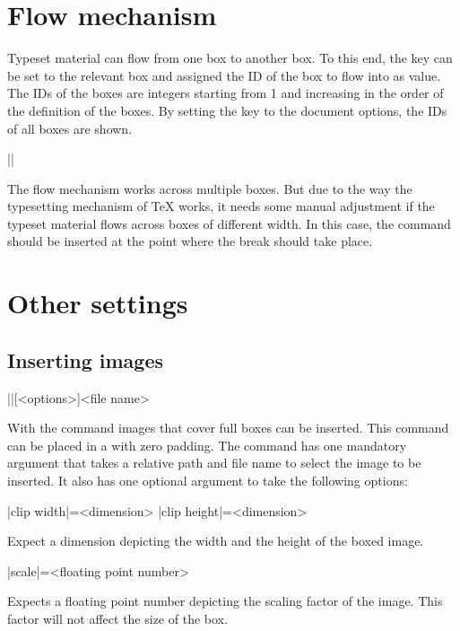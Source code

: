 \documentclass[a4paper]{article}
\begin{document}
\section{Flow mechanism}\label{sec:flow}

Typeset material can flow from one box to another box. To this end, the key  can be set to the relevant box and assigned the ID of the box to flow into as value. The IDs of the boxes are integers starting from 1 and increasing in the order of the definition of the boxes. By setting the key  to the document options, the IDs of all boxes are shown.

\begin{macrodef}
|\leporelloboxbreak|
\end{macrodef}
The flow mechanism works across multiple boxes. But due to the way the typesetting mechanism of TeX works, it needs some manual adjustment if the typeset material flows across boxes of different width. In this case, the command \macro{\leporelloboxbreak} should be inserted at the point where the break should take place.

\section{Other settings}

\subsection{Inserting images}

\begin{macrodef}
|\leporelloimage|[<options>]{<file name>}
\end{macrodef}
With the command \macro{\leporelloimage} images that cover full boxes can be inserted. This command can be placed in a  with zero padding. The command has one mandatory argument that takes a relative path and file name to select the image to be inserted. It also has one optional argument to take the following options:

\begin{macrodef}
|clip width|={<dimension>}
|clip height|={<dimension>}
\end{macrodef}
Expect a dimension depicting the width and the height of the boxed image.

\begin{macrodef}
|scale|={<floating point number>}
\end{macrodef}
Expects a floating point number depicting the scaling factor of the image. This factor will not affect the size of the box.
\end{document}
